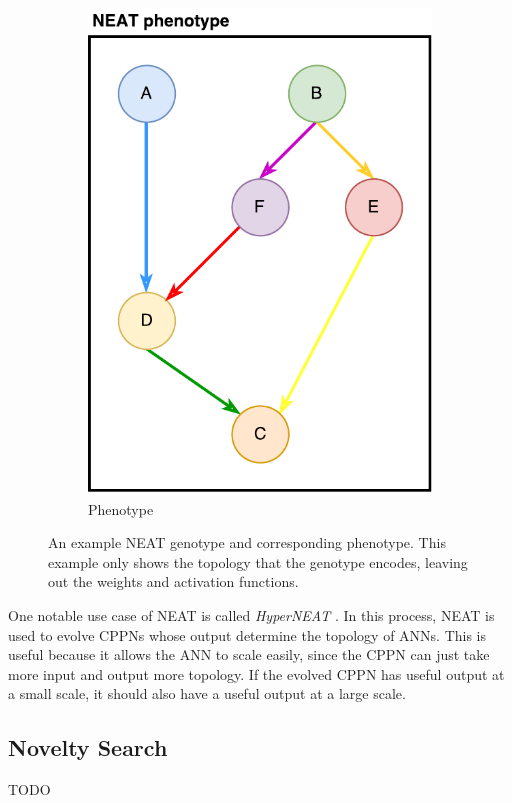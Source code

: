 \begin{figure}
\begin{subfigure}[t]{.33\columnwidth}
\includegraphics[width=\columnwidth]{fig/NEAT_pt}
\caption{Phenotype}
\end{subfigure}

\caption[Example NEAT genotype and phenotype]{
An example NEAT genotype and corresponding phenotype.
This example only shows the topology that the genotype encodes, leaving out the weights and activation functions.
}
\label{fig:neat}
\end{figure}

One notable use case of NEAT is called \textit{HyperNEAT} \cite{stanley2009hypercube}.
In this process, NEAT is used to evolve CPPNs whose output determine the topology of ANNs.
This is useful because it allows the ANN to scale easily, since the CPPN can just take more input and output more topology.
If the evolved CPPN has useful output at a small scale, it should also have a useful output at a large scale.

\subsection{Novelty Search}
TODO
